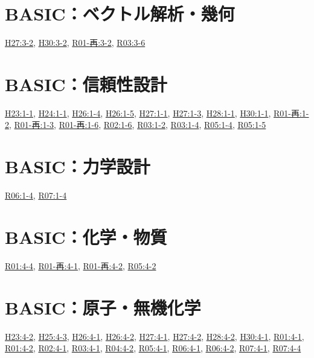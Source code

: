 \section{BASIC：ベクトル解析・幾何}
\hyperref[q:h27-reg-basic-3-2]{H27:3-2}, \hyperref[q:h30-reg-basic-3-2]{H30:3-2}, \hyperref[q:r01-ret-basic-3-2]{R01-再:3-2}, \hyperref[q:r03-reg-basic-3-6]{R03:3-6}
\section{BASIC：信頼性設計}
\hyperref[q:h23-reg-basic-1-1]{H23:1-1}, \hyperref[q:h24-reg-basic-1-1]{H24:1-1}, \hyperref[q:h26-reg-basic-1-4]{H26:1-4}, \hyperref[q:h26-reg-basic-1-5]{H26:1-5}, \hyperref[q:h27-reg-basic-1-1]{H27:1-1}, \hyperref[q:h27-reg-basic-1-3]{H27:1-3}, \hyperref[q:h28-reg-basic-1-1]{H28:1-1}, \hyperref[q:h30-reg-basic-1-1]{H30:1-1}, \hyperref[q:r01-ret-basic-1-2]{R01-再:1-2}, \hyperref[q:r01-ret-basic-1-3]{R01-再:1-3}, \hyperref[q:r01-ret-basic-1-6]{R01-再:1-6}, \hyperref[q:r02-reg-basic-1-6]{R02:1-6}, \hyperref[q:r03-reg-basic-1-2]{R03:1-2}, \hyperref[q:r03-reg-basic-1-4]{R03:1-4}, \hyperref[q:r05-reg-basic-1-4]{R05:1-4}, \hyperref[q:r05-reg-basic-1-5]{R05:1-5}
\section{BASIC：力学設計}
\hyperref[q:r06-reg-basic-1-4]{R06:1-4}, \hyperref[q:r07-reg-basic-1-4]{R07:1-4}
\section{BASIC：化学・物質}
\hyperref[q:r01-reg-basic-4-4]{R01:4-4}, \hyperref[q:r01-ret-basic-4-1]{R01-再:4-1}, \hyperref[q:r01-ret-basic-4-2]{R01-再:4-2}, \hyperref[q:r05-reg-basic-4-2]{R05:4-2}
\section{BASIC：原子・無機化学}
\hyperref[q:h23-reg-basic-4-2]{H23:4-2}, \hyperref[q:h25-reg-basic-4-3]{H25:4-3}, \hyperref[q:h26-reg-basic-4-1]{H26:4-1}, \hyperref[q:h26-reg-basic-4-2]{H26:4-2}, \hyperref[q:h27-reg-basic-4-1]{H27:4-1}, \hyperref[q:h27-reg-basic-4-2]{H27:4-2}, \hyperref[q:h28-reg-basic-4-2]{H28:4-2}, \hyperref[q:h30-reg-basic-4-1]{H30:4-1}, \hyperref[q:r01-reg-basic-4-1]{R01:4-1}, \hyperref[q:r01-reg-basic-4-2]{R01:4-2}, \hyperref[q:r02-reg-basic-4-1]{R02:4-1}, \hyperref[q:r03-reg-basic-4-1]{R03:4-1}, \hyperref[q:r04-reg-basic-4-2]{R04:4-2}, \hyperref[q:r05-reg-basic-4-1]{R05:4-1}, \hyperref[q:r06-reg-basic-4-1]{R06:4-1}, \hyperref[q:r06-reg-basic-4-2]{R06:4-2}, \hyperref[q:r07-reg-basic-4-1]{R07:4-1}, \hyperref[q:r07-reg-basic-4-4]{R07:4-4}
